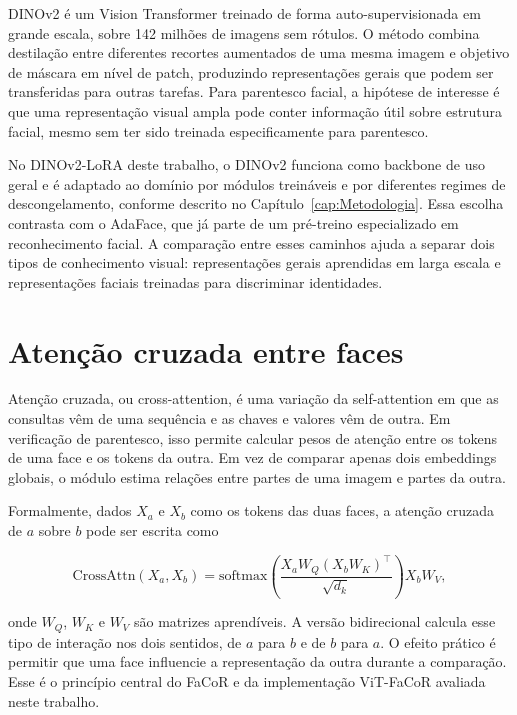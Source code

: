 DINOv2 \cite{oquab2024dinov2}
é um Vision Transformer treinado de forma auto-supervisionada em grande escala, sobre 142 milhões de imagens sem rótulos. O método combina destilação entre diferentes recortes aumentados de uma mesma imagem e objetivo de máscara em nível de patch, produzindo representações gerais que podem ser transferidas para outras tarefas. Para parentesco facial, a hipótese de interesse é que uma representação visual ampla pode conter informação útil sobre estrutura facial, mesmo sem ter sido treinada especificamente para parentesco.

No DINOv2-LoRA deste trabalho, o DINOv2 funciona como backbone de uso geral e é adaptado ao domínio por módulos treináveis e por diferentes regimes de descongelamento, conforme descrito no Capítulo~\ref{cap:Metodologia}. Essa escolha contrasta com o AdaFace, que já parte de um pré-treino especializado em reconhecimento facial. A comparação entre esses caminhos ajuda a separar dois tipos de conhecimento visual: representações gerais aprendidas em larga escala e representações faciais treinadas para discriminar identidades.

\section{Atenção cruzada entre faces}

Atenção cruzada, ou cross-attention, é uma variação da self-attention em que as consultas vêm de uma sequência e as chaves e valores vêm de outra. Em verificação de parentesco, isso permite calcular pesos de atenção entre os tokens de uma face e os tokens da outra. Em vez de comparar apenas dois embeddings globais, o módulo estima relações entre partes de uma imagem e partes da outra.

Formalmente, dados $X_a$ e $X_b$ como os tokens das duas faces, a atenção cruzada de $a$ sobre $b$ pode ser escrita como

\begin{equation}
\text{CrossAttn}(X_a, X_b) = \mathrm{softmax}\!\left( \frac{X_a W_Q (X_b W_K)^\top}{\sqrt{d_k}} \right) X_b W_V,
\label{eq:cross_attention}
\end{equation}

onde $W_Q$, $W_K$ e $W_V$ são matrizes aprendíveis. A versão bidirecional calcula esse tipo de interação nos dois sentidos, de $a$ para $b$ e de $b$ para $a$. O efeito prático é permitir que uma face influencie a representação da outra durante a comparação. Esse é o princípio central do FaCoR \cite{su2023facornet} e da implementação ViT-FaCoR avaliada neste trabalho.

